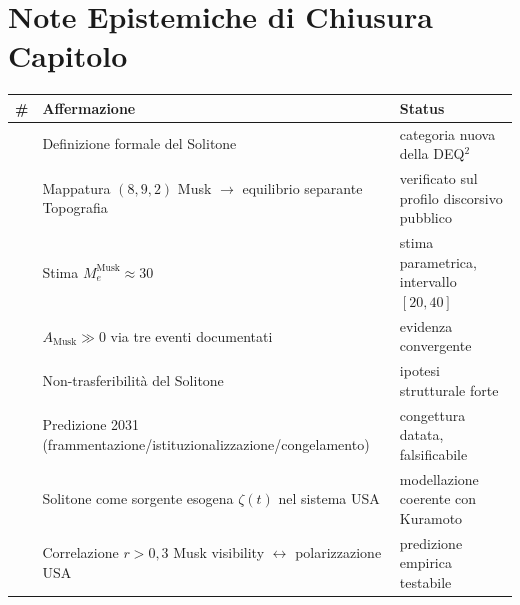 \section{Note Epistemiche di Chiusura
Capitolo}\label{note-epistemiche-di-chiusura-capitolo}

{\def\LTcaptype{none} %
{\small\begin{longtable}[]{@{}
  >{\raggedright\arraybackslash}p{}
  >{\raggedright\arraybackslash}p{}
  >{\raggedright\arraybackslash}p{}@{}}
\toprule\noalign{}
\begin{minipage}[b]{\linewidth}\raggedright
\#
\end{minipage} & \begin{minipage}[b]{\linewidth}\raggedright
Affermazione
\end{minipage} & \begin{minipage}[b]{\linewidth}\raggedright
Status
\end{minipage} \\
\midrule\noalign{}
\endhead
\bottomrule\noalign{}
\endlastfoot
1 & Definizione formale del Solitone & \Hypoth{} categoria nuova della
DEQ$^2$ \\
2 & Mappatura \((8, 9, 2)\) Musk $\to$ equilibrio separante Topografia &
\Proved{} verificato sul profilo discorsivo pubblico \\
3 & Stima \(M_e^{\text{Musk}} \approx 30\) & \Conj{} stima parametrica,
intervallo \([20, 40]\) \\
4 & \(A_{\text{Musk}} \gg 0\) via tre eventi documentati & \Proved{}
evidenza convergente \\
5 & Non-trasferibilità del Solitone & \Hypoth{} ipotesi strutturale
forte \\
6 & Predizione 2031 (frammentazione/istituzionalizzazione/congelamento)
& \Conj{} congettura datata, falsificabile \\
7 & Solitone come sorgente esogena \(\zeta(t)\) nel sistema USA &
\Hypoth{} modellazione coerente con Kuramoto \\
8 & Correlazione \(r > 0{,}3\) Musk visibility $\leftrightarrow$ polarizzazione USA &
\Conj{} predizione empirica testabile \\
\end{longtable}}
}


